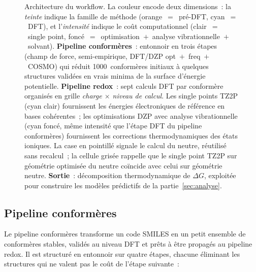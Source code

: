 \begin{figure}[htbp]
\caption{Architecture du workflow. La couleur encode deux dimensions~: la \emph{teinte} indique la famille de méthode (orange~$=$~pré-DFT, cyan~$=$~DFT), et l'\emph{intensité} indique le coût computationnel (clair~$=$~single point, foncé~$=$~optimisation~$+$~analyse vibrationnelle~$+$~solvant). \textbf{Pipeline conformères}~: entonnoir en trois étapes (champ de force, semi-empirique, DFT/DZP opt~$+$~freq~$+$~COSMO) qui réduit 1000~conformères initiaux à quelques structures validées en vrais minima de la surface d'énergie potentielle. \textbf{Pipeline redox}~: sept calculs DFT par conformère organisés en grille \emph{charge $\times$ niveau de calcul}. Les single points TZ2P (cyan clair) fournissent les énergies électroniques de référence en bases cohérentes~; les optimisations DZP avec analyse vibrationnelle (cyan foncé, même intensité que l'étape DFT du pipeline conformères) fournissent les corrections thermodynamiques des états ioniques. La case en pointillé signale le calcul du neutre, réutilisé sans recalcul~; la cellule grisée rappelle que le single point TZ2P sur géométrie optimisée du neutre coïncide avec celui sur géométrie neutre. \textbf{Sortie}~: décomposition thermodynamique de $\Delta G$, exploitée pour construire les modèles prédictifs de la partie~\ref{sec:analyse}.}
\label{fig:workflow}
\end{figure}

\subsection{Pipeline conformères}

Le pipeline conformères transforme un code SMILES en un petit ensemble de conformères stables, validés au niveau DFT et prêts à être propagés au pipeline redox. Il est structuré en entonnoir sur quatre étapes, chacune éliminant les structures qui ne valent pas le coût de l'étape suivante~:

